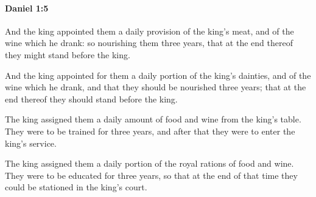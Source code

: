 		\paragraph{Daniel 1:5} %
			\label{DANIEL-1-5}

			And the king appointed them a daily provision of the king’s meat, and of the wine which he drank: so nourishing them three years, that at the end thereof they might stand before the king.

			\begin{versebox}
					\item[BHS] 
					\item[LXX] 
					\item[ASV] And the king appointed for them a daily portion of the king's dainties, and of the wine which he drank, and that they should be nourished three years; that at the end thereof they should stand before the king.
					\item[NIV] The king assigned them a daily amount of food and wine from the king’s table. They were to be trained for three years, and after that they were to enter the king’s service.
					\item[NRSV] The king assigned them a daily portion of the royal rations of food and wine. They were to be educated for three years, so that at the end of that time they could be stationed in the king’s court.
			\end{versebox}

